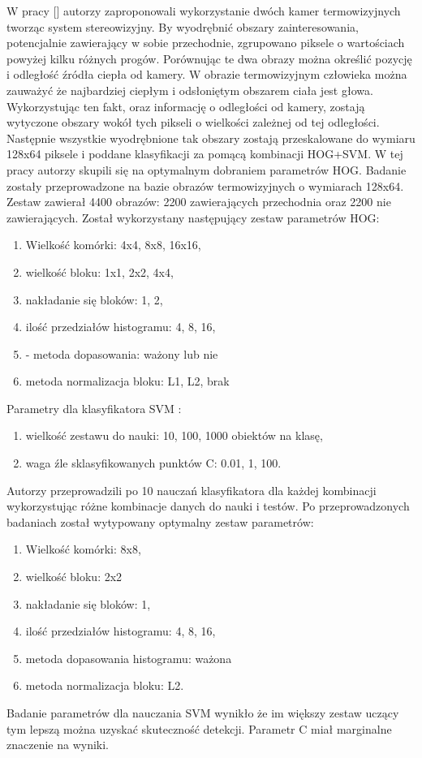 W pracy [] autorzy zaproponowali wykorzystanie dwóch kamer termowizyjnych tworząc system stereowizyjny. By wyodrębnić obszary zainteresowania, potencjalnie zawierający w sobie przechodnie, zgrupowano piksele o wartościach powyżej kilku różnych progów. Porównując te dwa obrazy można określić pozycję i odległość źródła ciepła od kamery. W obrazie termowizyjnym człowieka można zauważyć że najbardziej ciepłym i odsłoniętym obszarem ciała jest głowa. Wykorzystując ten fakt, oraz informację o odległości od kamery, zostają wytyczone obszary wokół tych pikseli o wielkości zależnej od tej odległości. Następnie wszystkie wyodrębnione tak obszary zostają przeskalowane do wymiaru 128x64 piksele i poddane klasyfikacji za pomącą kombinacji HOG+SVM. 
W tej pracy autorzy skupili się na optymalnym dobraniem parametrów HOG. Badanie zostały przeprowadzone na bazie obrazów termowizyjnych o wymiarach 128x64. Zestaw zawierał 4400 obrazów: 2200 zawierających przechodnia oraz 2200 nie zawierających. Został wykorzystany następujący zestaw parametrów HOG:
\begin{enumerate}

\item Wielkość komórki:  4x4, 8x8, 16x16,
\item wielkość bloku: 1x1, 2x2, 4x4,
\item nakładanie się bloków: 1, 2,
\item ilość przedziałów histogramu: 4, 8, 16,
\item- metoda dopasowania: ważony lub nie
\item metoda normalizacja bloku: L1, L2, brak
\end{enumerate}
Parametry dla klasyfikatora SVM :
\begin{enumerate}
\item wielkość zestawu do nauki: 10, 100, 1000 obiektów na klasę,
\item waga źle sklasyfikowanych punktów C: 0.01, 1, 100.
\end{enumerate}
Autorzy przeprowadzili po 10 nauczań klasyfikatora dla każdej kombinacji wykorzystując różne kombinacje danych do nauki i testów. Po przeprowadzonych badaniach został wytypowany optymalny zestaw parametrów:
\begin{enumerate}
\item Wielkość komórki: 8x8, 
\item wielkość bloku: 2x2
\item nakładanie się bloków: 1,
\item ilość przedziałów histogramu: 4, 8, 16,
\item metoda dopasowania histogramu: ważona 
\item metoda normalizacja bloku: L2.
\end{enumerate}
Badanie parametrów dla nauczania SVM wynikło że im większy zestaw uczący tym lepszą można uzyskać skuteczność detekcji. Parametr C miał marginalne znaczenie na wyniki.





